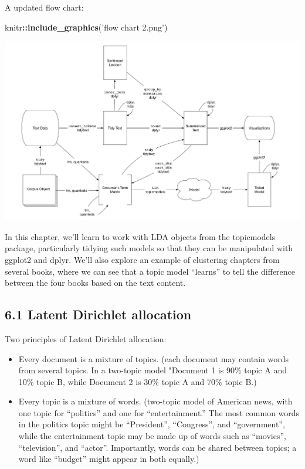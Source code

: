 \documentclass[]{article}
\newenvironment{Shaded}{\begin{snugshade}}{\end{snugshade}}
\newcommand{\KeywordTok}[1]{\textcolor[rgb]{0.13,0.29,0.53}{\textbf{#1}}}
\newcommand{\NormalTok}[1]{#1}
\newcommand{\OperatorTok}[1]{\textcolor[rgb]{0.81,0.36,0.00}{\textbf{#1}}}
\newcommand{\StringTok}[1]{\textcolor[rgb]{0.31,0.60,0.02}{#1}}
\providecommand{\tightlist}{%
  \setlength{\itemsep}{0pt}\setlength{\parskip}{0pt}}
\begin{document}
A updated flow chart:

\begin{Shaded}
\begin{Highlighting}[]
\NormalTok{knitr}\OperatorTok{::}\KeywordTok{include_graphics}\NormalTok{(}\StringTok{'flow chart 2.png'}\NormalTok{)}
\end{Highlighting}
\end{Shaded}

\includegraphics[width=22.86in]{flow chart 2}

In this chapter, we'll learn to work with LDA objects from the
topicmodels package, particularly tidying such models so that they can
be manipulated with ggplot2 and dplyr. We'll also explore an example of
clustering chapters from several books, where we can see that a topic
model ``learns'' to tell the difference between the four books based on
the text content.

\hypertarget{latent-dirichlet-allocation}{%
\subsection{6.1 Latent Dirichlet
allocation}\label{latent-dirichlet-allocation}}

Two principles of Latent Dirichlet allocation:

\begin{itemize}
\tightlist
\item
  Every document is a mixture of topics. (each document may contain
  words from several topics. In a two-topic model "Document 1 is 90\%
  topic A and 10\% topic B, while Document 2 is 30\% topic A and 70\%
  topic B.)
\item
  Every topic is a mixture of words. (two-topic model of American news,
  with one topic for ``politics'' and one for ``entertainment.'' The
  most common words in the politics topic might be ``President'',
  ``Congress'', and ``government'', while the entertainment topic may be
  made up of words such as ``movies'', ``television'', and ``actor''.
  Importantly, words can be shared between topics; a word like
  ``budget'' might appear in both equally.)
\end{itemize}
\end{document}
